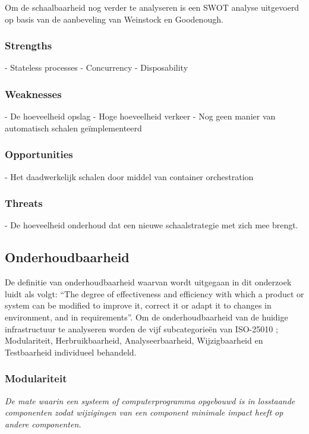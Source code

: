 Om de schaalbaarheid nog verder te analyseren is een SWOT analyse uitgevoerd op basis van de aanbeveling van Weinstock en Goodenough.

\subsubsection{Strengths}
- Stateless processes
- Concurrency
- Disposability

\subsubsection{Weaknesses}
- De hoeveelheid opslag
- Hoge hoeveelheid verkeer
- Nog geen manier van automatisch schalen geïmplementeerd

\subsubsection{Opportunities}
- Het daadwerkelijk schalen door middel van container orchestration

\subsubsection{Threats}
- De hoeveelheid onderhoud dat een nieuwe schaalstrategie met zich mee brengt.


\subsection{Onderhoudbaarheid}
De definitie van onderhoudbaarheid waarvan wordt uitgegaan in dit onderzoek luidt als volgt: \enquote{The degree of effectiveness and efficiency with which a product or system can be modified to improve it, correct it or adapt it to changes in environment, and in requirements}. Om de onderhoudbaarheid van de huidige infrastructuur te analyseren worden de vijf subcategorieën van ISO-25010 \parencite{ISO25010}; Modulariteit, Herbruikbaarheid, Analyseerbaarheid, Wijzigbaarheid en Testbaarheid individueel behandeld.

\subsubsection{Modulariteit} %
\textit{De mate waarin een systeem of computerprogramma opgebouwd is in losstaande componenten zodat wijzigingen van een component minimale impact heeft op andere componenten.}


